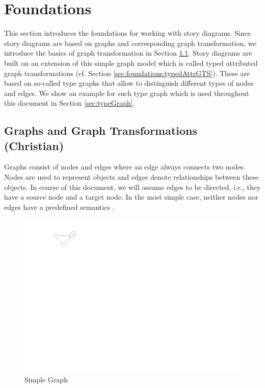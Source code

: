 \chapter{Foundations}
\label{sec:foundations}

This section introduces the foundations for working with story diagrams. Since story diagrams are based on graphs and corresponding graph transformation, we introduce the basics of graph transformation in Section \ref{sec:foundations:simpleGTS}. Story diagrams are built on an extension of this simple graph model which is called typed attributed graph transformations (cf. Section \ref{sec:foundations:typedAttrGTS}). These are based on so-called type graphs that allow to distinguish different types of nodes and edges. We show an example for such type graph which is used throughout this document in Section \ref{sec:typeGraph}.


\section{Graphs and Graph Transformations (Christian)}
\label{sec:foundations:simpleGTS}

Graphs consist of nodes and edges where an edge always connects two nodes. Nodes are used to represent objects and edges denote relationships between these objects. In course of this document, we will assume edges to be directed, i.e., they have a source node and a target node. In the most simple case, neither nodes nor edges have a predefined semantics \cite{Roz97}.

\begin{figure}[htbp]
  \centering
  \includegraphics[scale=1.5]{figures/SimpleGraph}
  \caption{Simple Graph}
  \label{fig:simpleGraph}
\end{figure}

